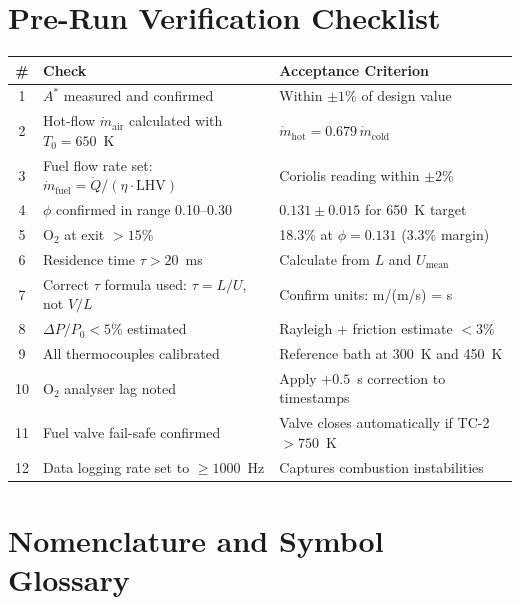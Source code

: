 \documentclass[12pt,a4paper]{report}
\begin{document}
\chapter{Pre-Run Verification Checklist}

\begin{center}
\renewcommand{\arraystretch}{1.5}
\begin{tabularx}{\linewidth}{@{}clX@{}}
  \toprule
  \textbf{\#} & \textbf{Check} & \textbf{Acceptance Criterion}\\
  \midrule
  \rowcolor{lightgray}
  1 & $A^*$ measured and confirmed & Within $\pm1\%$ of design value\\
  2 & Hot-flow $\dot{m}_\text{air}$ calculated with $T_0=650$~K
    & $\dot{m}_\text{hot} = 0.679\,\dot{m}_\text{cold}$\\
  \rowcolor{lightgray}
  3 & Fuel flow rate set: $\dot{m}_\text{fuel}=\dot{Q}/(\eta\cdot\text{LHV})$
    & Coriolis reading within $\pm2\%$\\
  4 & $\phi$ confirmed in range 0.10--0.30
    & $0.131 \pm 0.015$ for 650~K target\\
  \rowcolor{lightgray}
  5 & O$_2$ at exit $> 15\%$
    & 18.3\% at $\phi=0.131$ (3.3\% margin)\\
  6 & Residence time $\tau > 20$~ms
    & Calculate from $L$ and $U_\text{mean}$\\
  \rowcolor{lightgray}
  7 & Correct $\tau$ formula used: $\tau=L/U$, not $V/L$
    & Confirm units: m/(m/s) = s\\
  8 & $\Delta P/P_0 < 5\%$ estimated
    & Rayleigh + friction estimate $<3\%$\\
  \rowcolor{lightgray}
  9 & All thermocouples calibrated
    & Reference bath at 300~K and 450~K\\
  10 & O$_2$ analyser lag noted
    & Apply $+0.5$~s correction to timestamps\\
  \rowcolor{lightgray}
  11 & Fuel valve fail-safe confirmed
    & Valve closes automatically if TC-2 $>750$~K\\
  12 & Data logging rate set to $\geq 1000$~Hz
    & Captures combustion instabilities\\
  \bottomrule
\end{tabularx}
\end{center}

\chapter{Nomenclature and Symbol Glossary}
\end{document}
